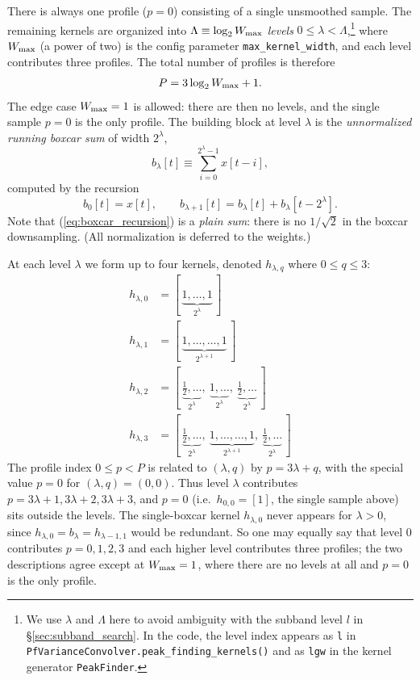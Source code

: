 \documentclass{article}
\numberwithin{equation}{section}   %
\def\nn{\nonumber}
\begin{document}
There is always one profile ($p=0$) consisting of a single unsmoothed sample. The remaining
kernels are organized into $\Lambda \equiv \log_2 W_{\rm max}$ {\em levels} $0 \le \lambda < \Lambda$,\footnote{We use $\lambda$ and $\Lambda$ here to avoid ambiguity with the subband level $l$ in \S\ref{sec:subband_search}. In the code, the level index appears as {\tt l} in {\tt PfVarianceConvolver.peak\_finding\_kernels()} and as {\tt lgw} in the kernel generator {\tt PeakFinder}.} where
$W_{\rm max}$ (a power of two) is the config parameter \verb|max_kernel_width|, and each level
contributes three profiles. The total number of profiles is therefore
\begin{equation}
P = 3 \log_2 W_{\rm max} + 1.
\end{equation}
The edge case $W_{\rm max}=1$ is allowed: there are then no levels, and the single sample
$p=0$ is the only profile.
The building block at level $\lambda$ is the {\em unnormalized running boxcar sum} of width $2^\lambda$,
\begin{equation}
b_\lambda[t] \equiv \sum_{i=0}^{2^\lambda - 1} x[t-i],
\end{equation}
computed by the recursion
\begin{equation}
b_0[t] = x[t], \qquad b_{\lambda+1}[t] = b_\lambda[t] + b_\lambda[t - 2^\lambda].
\label{eq:boxcar_recursion}
\end{equation}
Note that (\ref{eq:boxcar_recursion}) is a {\em plain sum}: there is no $1/\sqrt2$ in the boxcar
downsampling. (All normalization is deferred to the weights.)

At each level $\lambda$ we form up to four kernels, denoted $h_{\lambda,q}$ where $0\le q \le 3$:
\begin{align}
h_{\lambda,0} &= [\,\underbrace{1,\dots,1}_{2^\lambda}\,] \nn \\
h_{\lambda,1} &= [\,\underbrace{1,\dots,\dots,1}_{2^{\lambda+1}}\,] \nn \\
h_{\lambda,2} &= [\,\underbrace{\tfrac12,\dots}_{2^\lambda},\ \underbrace{1,\dots}_{2^\lambda},\ \underbrace{\tfrac12,\dots}_{2^\lambda}\,] \nn \\
h_{\lambda,3} &= [\,\underbrace{\tfrac12,\dots}_{2^\lambda},\ \underbrace{1,\dots,\dots,1}_{2^{\lambda+1}},\ \underbrace{\tfrac12,\dots}_{2^\lambda}\,]
\end{align}
The profile index $0\le p < P$ is related to $(\lambda,q)$ by $p = 3\lambda + q$, with the special value $p = 0$ for
$(\lambda,q) = (0,0)$. Thus level $\lambda$ contributes $p = 3\lambda+1, 3\lambda+2, 3\lambda+3$, and $p=0$ (i.e.\
$h_{0,0} = [1]$, the single sample above) sits outside the levels. The single-boxcar kernel $h_{\lambda,0}$ never
appears for $\lambda > 0$, since $h_{\lambda,0} = b_\lambda = h_{\lambda-1,1}$ would be redundant. So one may equally
say that level $0$ contributes $p=0,1,2,3$ and each higher level contributes three profiles; the two descriptions
agree except at $W_{\rm max}=1$, where there are no levels at all and $p=0$ is the only profile.
\end{document}
